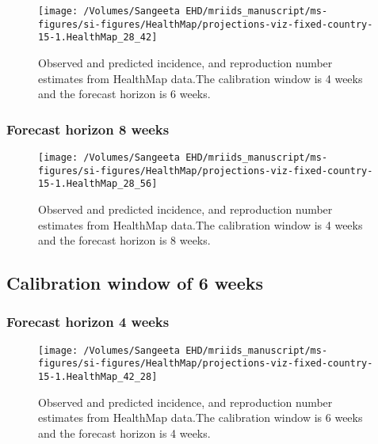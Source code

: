 \documentclass[11pt,]{article}
\begin{document}
\begin{figure}

  {\centering \texttt{[image: /Volumes/Sangeeta EHD/mriids\_manuscript/ms-figures/si-figures/HealthMap/projections-viz-fixed-country-15-1.HealthMap\_28\_42]} 

  }

  \caption{Observed and predicted incidence, and
    reproduction number estimates from HealthMap data.The calibration
    window is 4 weeks and the forecast horizon is 6 weeks.}
  \label{fig:hm46}
\end{figure}

\hypertarget{forecast-horizon-8-weeks-4}{%
  \subsubsection{Forecast horizon 8 weeks}\label{forecast-horizon-8-weeks-4}}

\begin{figure}

  {\centering \texttt{[image: /Volumes/Sangeeta EHD/mriids\_manuscript/ms-figures/si-figures/HealthMap/projections-viz-fixed-country-15-1.HealthMap\_28\_56]} 

  }

  \caption{Observed and predicted incidence, and reproduction number
    estimates from HealthMap data.The calibration window is 4 weeks
    and the forecast horizon is 8 weeks.}
  \label{fig:hm48}
\end{figure}

\hypertarget{calibration-window-of-6-weeks-1}{%
  \subsection{Calibration window of 6 weeks}\label{calibration-window-of-6-weeks-1}}

\hypertarget{forecast-horizon-4-weeks-4}{%
  \subsubsection{Forecast horizon 4
    weeks}\label{forecast-horizon-4-weeks-4}}

\begin{figure}

  {\centering \texttt{[image: /Volumes/Sangeeta EHD/mriids\_manuscript/ms-figures/si-figures/HealthMap/projections-viz-fixed-country-15-1.HealthMap\_42\_28]} 

  }

  \caption{Observed and predicted incidence, and reproduction number
    estimates from HealthMap data.The calibration window is 6 weeks
    and the forecast horizon is 4 weeks.}
  \label{fig:hm64}
\end{figure}
\end{document}
